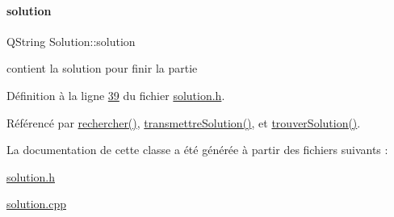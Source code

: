 \paragraph{\texorpdfstring{solution}{solution}}
{\footnotesize\ttfamily Q\+String Solution\+::solution\hspace{0.3cm}{\ttfamily [private]}}



contient la solution pour finir la partie 



Définition à la ligne \hyperlink{solution_8h_source_l00039}{39} du fichier \hyperlink{solution_8h_source}{solution.\+h}.



Référencé par \hyperlink{solution_8cpp_source_l00217}{rechercher()}, \hyperlink{solution_8cpp_source_l00042}{transmettre\+Solution()}, et \hyperlink{solution_8cpp_source_l00296}{trouver\+Solution()}.



La documentation de cette classe a été générée à partir des fichiers suivants \+:\begin{DoxyCompactItemize}
\item 
\hyperlink{solution_8h}{solution.\+h}\item 
\hyperlink{solution_8cpp}{solution.\+cpp}\end{DoxyCompactItemize}
